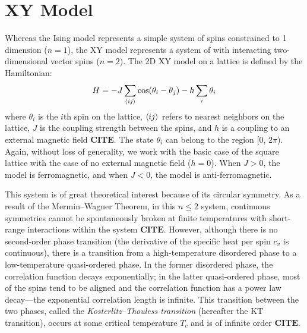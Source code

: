 \documentclass[twocolumn,aps]{revtex4-1} %
\begin{document}
\section{XY Model}
Whereas the Ising model represents a simple system of spins constrained to 1 dimension ($n=1$), the XY model represents a system of with interacting two-dimensional vector spins ($n=2$). The 2D XY model on a lattice is defined by the Hamiltonian: 
\begin{equation}
H = -J\sum_{\braket{ij}} \cos(\theta_i - \theta_j) - h\sum_i \theta_i
\end{equation}
where $\theta_i$ is the $i$th spin on the lattice, $\braket{ij}$ refers to nearest neighbors on the lattice, $J$ is the coupling strength between the spins, and $h$ is a coupling to an external magnetic field $\textbf{CITE}$. The state $\theta_i$ can belong to the region [0, 2$\pi$). Again, without loss of generality, we work with the basic case of the square lattice with the case of no external magnetic field ($h=0$). When $J > 0$, the model is ferromagnetic, and when $J<0$, the model is anti-ferromagnetic. 

This system is of great theoretical interest because of its circular symmetry. As a result of the Mermin--Wagner Theorem, in this $n \leq 2$ system, continuous symmetries cannot be spontaneously broken at finite temperatures with short-range interactions within the system $\textbf{CITE}$. However, although there is no second-order phase transition (the derivative of the specific heat per spin $c_v$ is continuous), there is a transition from a high-temperature disordered phase to a low-temperature quasi-ordered phase. In the former disordered phase, the correlation function decays exponentially; in the latter quasi-ordered phase, most of the spins tend to be aligned and the correlation function has a power law decay---the exponential correlation length is infinite. This transition between the two phases, called the \textit{Kosterlitz--Thouless transition} (hereafter the KT transition), occurs at some critical temperature $T_c$ and is of infinite order $\textbf{CITE}$. 
\end{document}
